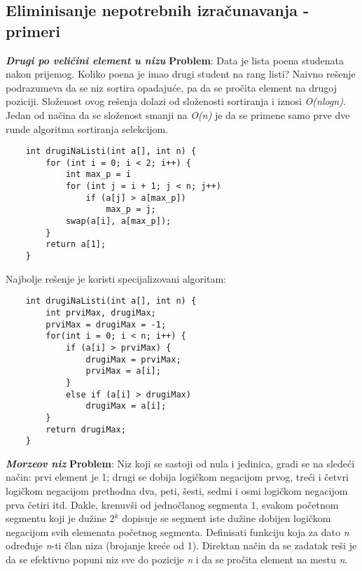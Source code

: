 \documentclass{article}
\begin{document}
\subsection{Eliminisanje nepotrebnih izračunavanja - primeri}
\textit{\textbf{Drugi po veličini element u nizu}}
\newline \textbf{Problem}: Data je lista poena studenata nakon prijemog. Koliko poena je imao
drugi student na rang listi?
\newline Naivno rešenje podrazumeva da se niz sortira opadajuće, pa da se pročita element
na drugoj poziciji. Složenost ovog rešenja dolazi od složenosti sortiranja i iznosi \textit{O(nlogn)}.
\newline Jedan od načina da se složenost
smanji na \textit{O(n)} je da se primene samo prve dve runde algoritma sortiranja
selekcijom.
\begin{lstlisting}
    int drugiNaListi(int a[], int n) {
        for (int i = 0; i < 2; i++) {
            int max_p = i
            for (int j = i + 1; j < n; j++)
                if (a[j] > a[max_p])
                    max_p = j;
            swap(a[i], a[max_p]);
        }
        return a[1];
    }
\end{lstlisting}
Najbolje rešenje je koristi specijalizovani algoritam:
\begin{lstlisting}
    int drugiNaListi(int a[], int n) {
        int prviMax, drugiMax;
        prviMax = drugiMax = -1;
        for(int i = 0; i < n; i++) {
            if (a[i] > prviMax) {
                drugiMax = prviMax;
                prviMax = a[i];
            } 
            else if (a[i] > drugiMax)
                drugiMax = a[i];
        }
        return drugiMax;
    }
\end{lstlisting}
\vspace{0.2cm}\textit{\textbf{Morzeov niz}}
\newline \textbf{Problem}: Niz koji se sastoji od nula i jedinica, gradi se na sledeći način: prvi element je 1; drugi
se dobija logičkom negacijom prvog, treći i četvri logičkom negacijom
prethodna dva, peti, šesti, sedmi i osmi logičkom negacijom prva
četiri itd. Dakle, krenuvši od jednočlanog segmenta 1, svakom
početnom segmentu koji je dužine 2$^k$ dopisuje
se segment iste dužine dobijen logičkom negacijom svih elemenata početnog
segmenta. Definisati funkciju koja za dato \textit{n} određuje \textit{n}-ti član niza (brojanje
kreće od 1). 
\newpage Direktan način da se zadatak reši je da se efektivno popuni niz sve do pozicije \textit{n}
i da se pročita element na mestu \textit{n}.
\end{document}
